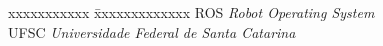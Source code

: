 \ifx\isenglish\undefined
{}
\else
{}
\fi


\begin{tabbing}
xxxxxxxxxxx \= xxxxxxxxxxxxx \kill
\textsc{ROS}            \> \textit{Robot Operating System}\\
\textsc{UFSC} \> \textit{Universidade Federal de Santa Catarina}\\
\end{tabbing}

